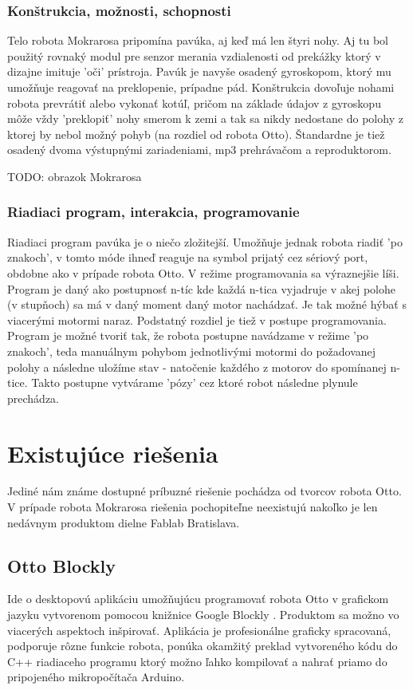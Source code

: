 \subsubsection{Konštrukcia, možnosti, schopnosti}
Telo robota Mokrarosa pripomína pavúka, aj keď má len štyri nohy. Aj tu bol použitý rovnaký modul pre senzor merania vzdialenosti od prekážky ktorý v dizajne imituje 'oči' prístroja. Pavúk je navyše osadený gyroskopom, ktorý mu umožňuje reagovať na preklopenie, prípadne pád. Konštrukcia dovoľuje nohami robota prevrátiť alebo vykonať kotúľ, pričom na základe údajov z gyroskopu môže vždy 'preklopiť' nohy smerom k zemi a tak sa nikdy nedostane do polohy z ktorej by nebol možný pohyb (na rozdiel od robota Otto). Štandardne je tiež osadený dvoma výstupnými zariadeniami, mp3 prehrávačom a reproduktorom.

TODO: obrazok Mokrarosa

\subsubsection{Riadiaci program, interakcia, programovanie}
Riadiaci program pavúka je o niečo zložitejší. Umožňuje jednak robota riadiť 'po znakoch', v tomto móde ihneď reaguje na symbol prijatý cez sériový port, obdobne ako v prípade robota Otto. V režime programovania sa výraznejšie líši. Program je daný ako postupnosť n-tíc kde každá n-tica vyjadruje v akej polohe (v stupňoch) sa má v daný moment daný motor nachádzať. Je tak možné hýbať s viacerými motormi naraz. Podstatný rozdiel je tiež v postupe programovania. Program je možné tvoriť tak, že robota postupne navádzame v režime 'po znakoch', teda manuálnym pohybom jednotlivými motormi do požadovanej polohy a následne uložíme stav - natočenie každého z motorov do spomínanej n-tice. Takto postupne vytvárame 'pózy' cez ktoré robot následne plynule prechádza.


\section{Existujúce riešenia}
Jediné nám známe dostupné príbuzné riešenie pochádza od tvorcov robota Otto. V prípade robota Mokrarosa riešenia pochopiteľne neexistujú nakoľko je len nedávnym produktom dielne Fablab Bratislava.

\subsection{Otto Blockly}
Ide o desktopovú aplikáciu umožňujúcu programovať robota Otto v grafickom jazyku vytvorenom pomocou knižnice Google Blockly \cite{OttoBlockly}. Produktom sa možno vo viacerých aspektoch inšpirovať. Aplikácia je profesionálne graficky spracovaná, podporuje rôzne funkcie robota, ponúka okamžitý preklad vytvoreného kódu do C++ riadiaceho programu ktorý možno ľahko kompilovať a nahrať priamo do pripojeného mikropočítača Arduino.

